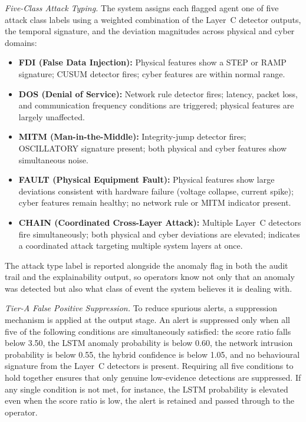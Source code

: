 \par \vspace{0.2cm}
\textit{Five-Class Attack Typing.} The system assigns each flagged agent one of five attack class labels using a weighted combination of the Layer~C detector outputs, the temporal signature, and the deviation magnitudes across physical and cyber domains:
\begin{itemize}
    \item \textbf{FDI (False Data Injection):} Physical features show a STEP or RAMP signature; CUSUM detector fires; cyber features are within normal range.
    \item \textbf{DOS (Denial of Service):} Network rule detector fires; latency, packet loss, and communication frequency conditions are triggered; physical features are largely unaffected.
    \item \textbf{MITM (Man-in-the-Middle):} Integrity-jump detector fires; OSCILLATORY signature present; both physical and cyber features show simultaneous noise.
    \item \textbf{FAULT (Physical Equipment Fault):} Physical features show large deviations consistent with hardware failure (voltage collapse, current spike); cyber features remain healthy; no network rule or MITM indicator present.
    \item \textbf{CHAIN (Coordinated Cross-Layer Attack):} Multiple Layer~C detectors fire simultaneously; both physical and cyber deviations are elevated; indicates a coordinated attack targeting multiple system layers at once.
\end{itemize}
The attack type label is reported alongside the anomaly flag in both the audit trail and the explainability output, so operators know not only that an anomaly was detected but also what class of event the system believes it is dealing with.

\par \vspace{0.2cm}
\textit{Tier-A False Positive Suppression.} To reduce spurious alerts, a suppression mechanism is applied at the output stage. An alert is suppressed only when all five of the following conditions are simultaneously satisfied: the score ratio falls below 3.50, the LSTM anomaly probability is below 0.60, the network intrusion probability is below 0.55, the hybrid confidence is below 1.05, and no behavioural signature from the Layer~C detectors is present. Requiring all five conditions to hold together ensures that only genuine low-evidence detections are suppressed. If any single condition is not met, for instance, the LSTM probability is elevated even when the score ratio is low, the alert is retained and passed through to the operator.


